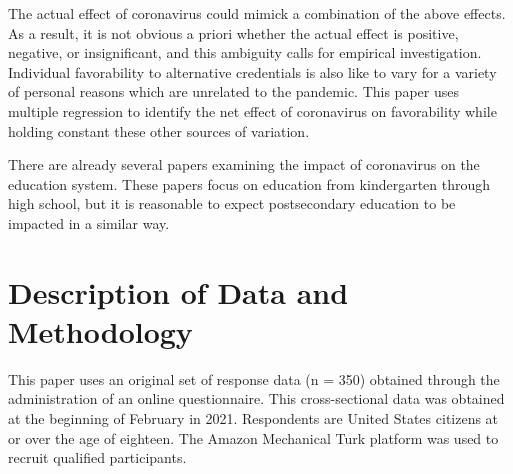 \documentclass[review]{elsarticle}
\begin{document}
The actual effect of coronavirus could mimick a combination of the above effects.
As a result, it is not obvious a priori whether the actual effect is positive, negative, or insignificant,
and this ambiguity calls for empirical investigation.
Individual favorability to alternative credentials is also like to vary for a variety of personal reasons which are unrelated to the pandemic.
This paper uses multiple regression to identify the net effect of coronavirus on favorability while holding constant these other sources of variation.

There are already several papers examining the impact of coronavirus on the education system.
These papers focus on education from kindergarten through high school,
but it is reasonable to expect postsecondary education to be impacted in a similar way.


\section{Description of Data and Methodology}

This paper uses an original set of response data (n = 350) obtained through the administration of an online questionnaire.
This cross-sectional data was obtained at the beginning of February in 2021.
Respondents are United States citizens at or over the age of eighteen.
The Amazon Mechanical Turk platform was used to recruit qualified participants.
\end{document}
